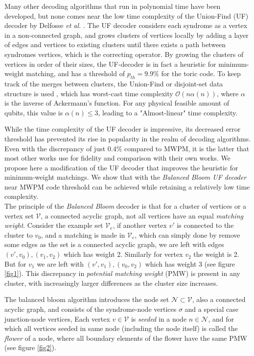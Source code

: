 \documentclass[10pt, a4paper, twoside, titlepage, usenames,dvipsnames]{report}
\begin{document}
Many other decoding algorithms that run in polynomial time have been developed, but none comes near the low time complexity of the Union-Find (UF) decoder by Delfosse \emph{et al.} \cite{delfosse2017linear, delfosse2017almost}. The UF decoder considers each syndrome as a vertex in a non-connected graph, and grows clusters of vertices locally by adding a layer of edges and vertices to existing clusters until there exists a path between syndromes vertices, which is the correcting operator. By growing the clusters of vertices in order of their sizes, the UF-decoder is in fact a heuristic for minimum-weight matching, and has a threshold of $p_{th} = 9.9\%$ for the toric code. To keep track of the merges between clusters, the Union-Find or disjoint-set data structure is used \cite{tarjan1975efficiency}, which has worst-cast time complexity $\mathcal{O}(n\alpha(n))$, where $\alpha$ is the inverse of Ackermann's function. For any physical feasible amount of qubits, this value is $\alpha(n) \leq 3$, leading to a "Almost-linear" time complexity.

While the time complexity of the UF decoder is impressive, its decreased error threshold has prevented its rise in popularity in the realm of decoding algorithms. Even with the discrepancy of just $0.4\%$ compared to MWPM, it is the latter that most other works use for fidelity and comparison with their own works. We propose here a modification of the UF decoder that improves the heuristic for minimum-weight matchings. We show that with the \emph{Balanced Bloom UF decoder} near MWPM code threshold can be achieved while retaining a relatively low time complexity.\\

The principle of the \emph{Balanced Bloom} decoder is that for a cluster of vertices or a vertex set $\mathcal{V}$, a connected acyclic graph, not all vertices have an equal \emph{matching weight}. Consider the example set $\mathcal{V}_e$, if another vertex $v'$ is connected to the cluster to $v_0$, and a matching is made in $\mathcal{V}_e$, which can simply done by remove some edges as the set is a connected acyclic graph, we are left with edges $(v', v_0), (v_1, v_2)$ which has weight 2. Similarly for vertex $v_2$ the weight is 2. But for $v_1$ we are left with $(v', v_1), (v_0, v_2)$ which has weight 3 (see figure \ref{fig1}). This discrepancy in \emph{potential matching weight} (PMW) is present in any cluster, with increasingly larger differences as the cluster size increases.

The balanced bloom algorithm introduces the node set $\mathcal{N} \subset \mathcal{V}$, also a connected acyclic graph, and consists of the syndrome-node vertices $\sigma$ and a special case junction-node vertices, Each vertex $v \in \mathcal{V}$ is \emph{seeded} in a node $n\in \mathcal{N}$, and for which all vertices seeded in same node (including the node itself) is called the \emph{flower} of a node, where all boundary elements of the flower have the same PMW (see figure \ref{fig2}).
\end{document}
